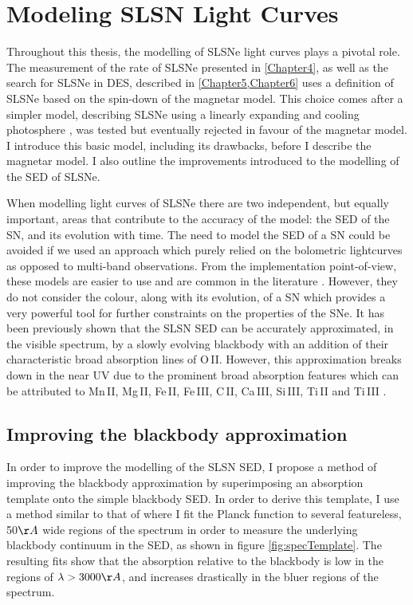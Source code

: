 \section{Modeling SLSN Light Curves} \label{sec:SLAP}
Throughout this thesis, the modelling of SLSNe light curves plays a pivotal role. The measurement of the rate of SLSNe presented in \cref{Chapter4}, as well as the search for SLSNe in DES, described in \cref{Chapter5,Chapter6} uses a definition of SLSNe based on the spin-down of the magnetar model. This choice comes after a simpler model, describing SLSNe using a linearly expanding and cooling photosphere \citep{Howell2013}, was tested but eventually rejected in favour of the magnetar model. I introduce this basic model, including its drawbacks, before I describe the magnetar model. I also outline the improvements introduced to the modelling of the SED of SLSNe.

When modelling light curves of SLSNe there are two independent, but equally important, areas that contribute to the accuracy of the model: the SED of the SN, and its evolution with time. The need to model the SED of a SN could be avoided if we used an approach which purely relied on the bolometric lightcurves as opposed to multi-band observations. From the implementation point-of-view, these models are easier to use and are common in the literature \citep{Inserra2013,Papadopoulos2015,Nicholl2014}. However, they do not consider the colour, along with its evolution, of a SN which provides a very powerful tool for further constraints on the properties of the SNe. It has been previously shown \citep{Chomiuk2011,Howell2013,Papadopoulos2015,Vreeswijk2014} that the SLSN SED can be accurately approximated, in the visible spectrum, by a slowly evolving blackbody with an addition of their characteristic broad absorption lines of O\,II. However, this approximation breaks down in the near UV due to the prominent broad absorption features which can be attributed to Mn\,II, Mg\,II, Fe\,II, Fe\,III, C\,II, Ca\,III, Si\,III, Ti\,II and Ti\,III \citep[see][for line identifications]{Mazzali2016,Quimby2018}.

\subsection{Improving the blackbody approximation} \label{sec:KCorrection}
In order to improve the modelling of the SLSN SED, I propose a method of improving the blackbody approximation by superimposing an absorption template onto the simple blackbody SED. In order to derive this template, I use a method similar to that of  \citet{Vreeswijk2014} where I fit the Planck function to several featureless, 50$\AA$ wide regions of the spectrum in order to measure the underlying blackbody continuum in the SED, as shown in figure \ref{fig:specTemplate}. The resulting fits show that the absorption relative to the blackbody is low in the regions of $\lambda>3000\AA$, and increases drastically in the bluer regions of the spectrum.

